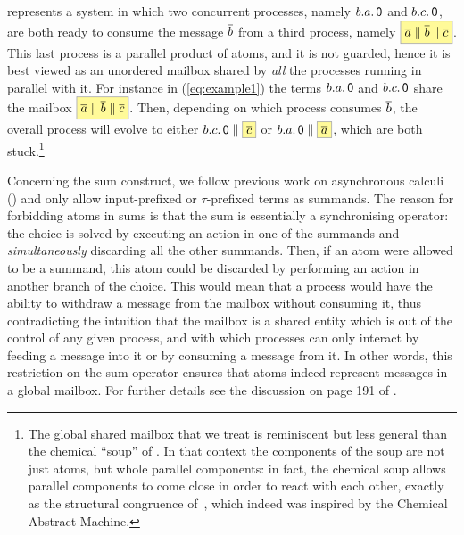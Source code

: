 represents a system in which two concurrent processes,
namely $b.a.\mathop{\textsf{0}}$ and $ b.c.\mathop{\textsf{0}} $, are both
ready to consume the message $ \overline{b} $
from a third process, namely $\mailbox{\co{a} \Par \co{b} \Par \co{c}}$.
This last process is a parallel product of atoms, and it is not
guarded, hence it is best viewed as an unordered mailbox shared by {\em all}
the processes running in parallel with it. For instance in (\ref{eq:example1})
the terms $ b.a.\mathop{\textsf{0}}$ and $b.c.\mathop{\textsf{0}}$ share the mailbox $\mailbox{ \co{a} \Par \co{b}
  \Par \co{c} }$.  Then, depending on which process consumes $\overline{b}$,
the overall process will evolve to either
$b.c.\Nil \Par \mailbox{\co{c}} $ or $b.a.\Nil \Par \mailbox{\co{a}}$,
which are both stuck.\footnote{The global shared mailbox that we
    treat is reminiscent but less general than the chemical ``soup''
    of \cite{DBLP:journals/tcs/BerryB92}.  In that context the
    components of the soup are not just atoms, but whole parallel
    components: in fact, the chemical soup allows parallel components
    to come close in order to react with each other, exactly as
      the structural congruence of~\cite{DBLP:conf/icalp/Milner90}, which indeed was
    inspired by the Chemical Abstract Machine.}

Concerning the sum construct, we follow previous work on
asynchronous calculi
(\cite{ACS96, ACS98, DBLP:books/daglib/0004377,DBLP:journals/iandc/BorealeNP02})
and only allow input-prefixed or $\tau$-prefixed terms as
  summands. %
The reason for forbidding atoms in sums is that the
  \nondeterministic sum is essentially a synchronising operator: the
  choice is solved by executing an action in one of the summands and
  \emph{simultaneously} discarding all the other summands. Then, if an
  atom were allowed to be a summand, this atom could be discarded by
  performing an action in another branch of the choice. This would
  mean that a process would have the ability to withdraw a message
  from the mailbox without consuming it, thus contradicting the
  intuition that the mailbox is a shared entity which is out of the
  control of any given process, and with which processes can only
  interact by feeding a message into it or by consuming a message from
  it.  In other words, this restriction on the sum operator
ensures that atoms %
indeed represent messages in a global
mailbox. For further details see the discussion on page 191 of
\cite{DBLP:books/daglib/0004377}.



